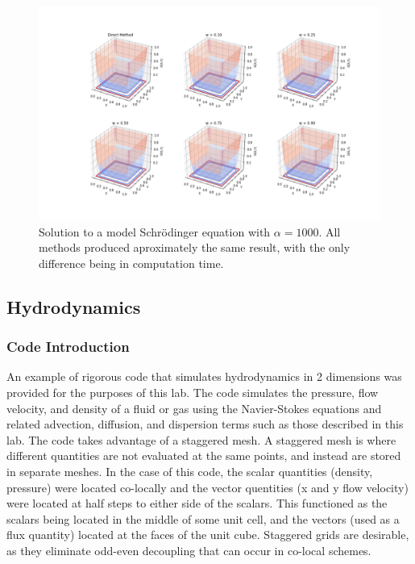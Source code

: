 \documentclass[twocolumn]{article}
\begin{document}
\begin{figure}
	\centering
	\includegraphics[width=\textwidth]{schroe_alpha_1000}
	\caption{Solution to a model Schr\"{o}dinger equation with $\alpha=1000$. All methods produced aproximately the same result, with the only difference being in computation time.}
	\label{fig:schroe_alpha_1000}
\end{figure}

\subsection{Hydrodynamics}
\subsubsection{Code Introduction}

An example of rigorous code that simulates hydrodynamics in 2 dimensions was provided for the purposes of this lab. The code simulates the pressure, flow velocity, and density of a fluid or gas using the Navier-Stokes equations and related advection, diffusion, and dispersion terms such as those described in this lab. The code takes advantage of a staggered mesh. A staggered mesh is where different quantities are not evaluated at the same points, and instead are stored in separate meshes. In the case of this code, the scalar quantities (density, pressure) were located co-locally and the vector quentities (x and y flow velocity) were located at half steps to either side of the scalars. This functioned as the scalars being located in the middle of some unit cell, and the vectors (used as a flux quantity) located at the faces of the unit cube. Staggered grids are desirable, as they eliminate odd-even decoupling that can occur in co-local schemes.
\end{document}
